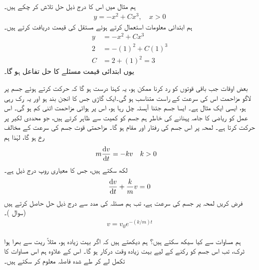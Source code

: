 ہم  مثال  میں اس کا درج ذیل حل تلاش کر چکے ہیں۔
\begin{align*}
y=-x^2+Cx^3,\quad x>0
\end{align*}
ہم ابتدائی معلومات استعمال کرتے ہوئے مستقل  کی قیمت دریافت کرتے ہیں۔
\begin{align*}
y&=-x^2+Cx^3\\
2&=-(1)^2+C(1)^3\\
C&=2+(1)^2=3
\end{align*}
یوں ابتدائی قیمت مسئلے کا حل تفاعل  ہو گا۔

بعض اوقات جب باقی قوتوں کو رد کرنا ممکن ہو، یہ کہنا درست ہو گا کہ حرکت کرتے ہوئے جسم پر لاگو مزاحمت اس کی سرعت کے راست متناسب ہو گی۔ایک گاڑی جس کا انجن بند ہو اور یہ رک رہی ہو، ایسی ایک مثال ہے۔ ایسا جسم جتنا آہستہ چل رہا ہو، اس پر ہوائی مزاحمت اتنی کم ہو گی۔ اس عمل کو ریاضی کا جامہ پہنانے کی خاطر ہم جسم کو کمیت  سے ظاہر کرتے ہیں، جو محددی لکیر پر حرکت کرتا ہے۔ لمحہ  پر اس جسم کی رفتار  اور مقام  ہو گا۔ مزاحمتی قوت جسم کی سرعت کے مخالف  رخ ہو گا، لہٰذا ہم
\begin{align*}
m\frac{\dif v}{\dif t}&=-kv&& k>0
\end{align*}
لکھ سکتے ہیں، جس کا  معیاری روپ  درج ذیل ہے۔
\begin{align*}
\frac{\dif v}{\dif t}+\frac{k}{m}v=0
\end{align*}
فرض کریں لمحہ  پر جسم کی سرعت  ہے، تب ہم مسئلہ  کی مدد سے  درج ذیل حل حاصل  کرتے ہیں (سوال )۔
\begin{align}\label{مساوات_ماورائی_حل_مزاحمت_رفتار_کے_راست}
v=v_0e^{-(k/m)t}
\end{align}

ہم مساوات  سے کیا سیکھ سکتے ہیں؟ ہم دیکھتے ہیں کہ اگر  بہت زیادہ ہو، مثلاً ریت سے بھرا ہوا ٹرک،  تب اس جسم کو رکنے کے لیے بہت زیادہ وقت درکار ہو گا۔ اس کے علاوہ ہم اس مساوات کا تکمل لے کر طے شدہ فاصلہ  معلوم کر سکتے ہیں۔ 

